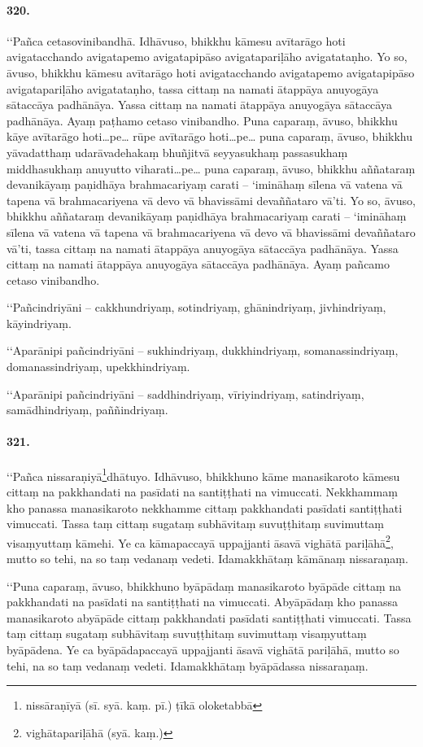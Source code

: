 \paragraph{320.} ‘‘Pañca cetasovinibandhā. Idhāvuso, bhikkhu kāmesu avītarāgo hoti avigatacchando avigatapemo avigatapipāso avigatapariḷāho avigatataṇho. Yo so, āvuso, bhikkhu kāmesu avītarāgo hoti avigatacchando avigatapemo avigatapipāso avigatapariḷāho avigatataṇho, tassa cittaṃ na namati ātappāya anuyogāya sātaccāya padhānāya. Yassa cittaṃ na namati ātappāya anuyogāya sātaccāya padhānāya. Ayaṃ paṭhamo cetaso vinibandho. Puna caparaṃ, āvuso, bhikkhu kāye avītarāgo hoti…pe… rūpe avītarāgo hoti…pe… puna caparaṃ, āvuso, bhikkhu yāvadatthaṃ udarāvadehakaṃ bhuñjitvā seyyasukhaṃ passasukhaṃ middhasukhaṃ anuyutto viharati…pe… puna caparaṃ, āvuso, bhikkhu aññataraṃ devanikāyaṃ paṇidhāya brahmacariyaṃ carati – ‘imināhaṃ sīlena vā vatena vā tapena vā brahmacariyena vā devo vā bhavissāmi devaññataro vā’ti. Yo so, āvuso, bhikkhu aññataraṃ devanikāyaṃ paṇidhāya brahmacariyaṃ carati – ‘imināhaṃ sīlena vā vatena vā tapena vā brahmacariyena vā devo vā bhavissāmi devaññataro vā’ti, tassa cittaṃ na namati ātappāya anuyogāya sātaccāya padhānāya. Yassa cittaṃ na namati ātappāya anuyogāya sātaccāya padhānāya. Ayaṃ pañcamo cetaso vinibandho.

‘‘Pañcindriyāni – cakkhundriyaṃ, sotindriyaṃ, ghānindriyaṃ, jivhindriyaṃ, kāyindriyaṃ.

‘‘Aparānipi pañcindriyāni – sukhindriyaṃ, dukkhindriyaṃ, somanassindriyaṃ, domanassindriyaṃ, upekkhindriyaṃ.

‘‘Aparānipi pañcindriyāni – saddhindriyaṃ, vīriyindriyaṃ, satindriyaṃ, samādhindriyaṃ, paññindriyaṃ.

\paragraph{321.} ‘‘Pañca nissaraṇiyā\footnote{nissāraṇīyā (sī. syā. kaṃ. pī.) ṭīkā oloketabbā}dhātuyo. Idhāvuso, bhikkhuno kāme manasikaroto kāmesu cittaṃ na pakkhandati na pasīdati na santiṭṭhati na vimuccati. Nekkhammaṃ kho panassa manasikaroto nekkhamme cittaṃ pakkhandati pasīdati santiṭṭhati vimuccati. Tassa taṃ cittaṃ sugataṃ subhāvitaṃ suvuṭṭhitaṃ suvimuttaṃ visaṃyuttaṃ kāmehi. Ye ca kāmapaccayā uppajjanti āsavā vighātā pariḷāhā\footnote{vighātapariḷāhā (syā. kaṃ.)}, mutto so tehi, na so taṃ vedanaṃ vedeti. Idamakkhātaṃ kāmānaṃ nissaraṇaṃ.

‘‘Puna caparaṃ, āvuso, bhikkhuno byāpādaṃ manasikaroto byāpāde cittaṃ na pakkhandati na pasīdati na santiṭṭhati na vimuccati. Abyāpādaṃ kho panassa manasikaroto abyāpāde cittaṃ pakkhandati pasīdati santiṭṭhati vimuccati. Tassa taṃ cittaṃ sugataṃ subhāvitaṃ suvuṭṭhitaṃ suvimuttaṃ visaṃyuttaṃ byāpādena. Ye ca byāpādapaccayā uppajjanti āsavā vighātā pariḷāhā, mutto so tehi, na so taṃ vedanaṃ vedeti. Idamakkhātaṃ byāpādassa nissaraṇaṃ.

